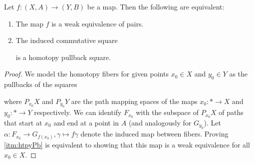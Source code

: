 \begin{lemma}\label{lem:weOfaPairsIsHtpyPb}
    Let $f\colon(X,A)\to (Y,B)$ be a map.
    Then the following are equivalent:
    \begin{enumerate}[label={(\roman*)}]
        \item The map $f$ is a weak equivalence of pairs. \label{itm:weOfPairs}
        \item The induced commutative square \begin{center} 
        \end{center}
        is a homotopy pullback square. \label{itm:htpyPb}
    \end{enumerate}
    \begin{proof}
        We model the homotopy fibers for given points $x_0\in X$ and $y_0\in Y$ as the pullbacks of the squares
        \begin{center} 
        \end{center}
        where $P_{x_0}X$ and $P_{y_0}Y$ are the path mapping spaces of the maps $x_0\colon *\to X$ and  $y_0\colon *\to Y$ respectively.
        We can identify $F_{x_0}$ with the subspace of $P_{x_0}X$ of paths that start at $x_0$ and end at a point in $A$ (and analogously for $G_{y_0}$).
        Let $\alpha\colon F_{x_0}\to G_{f(x_0)}, \gamma\mapsto f\gamma$ denote the induced map between fibers.
        Proving \ref{itm:htpyPb} is equivalent to showing that this map is a weak equivalence for all $x_0\in X$.


\end{proof}
\end{lemma}
